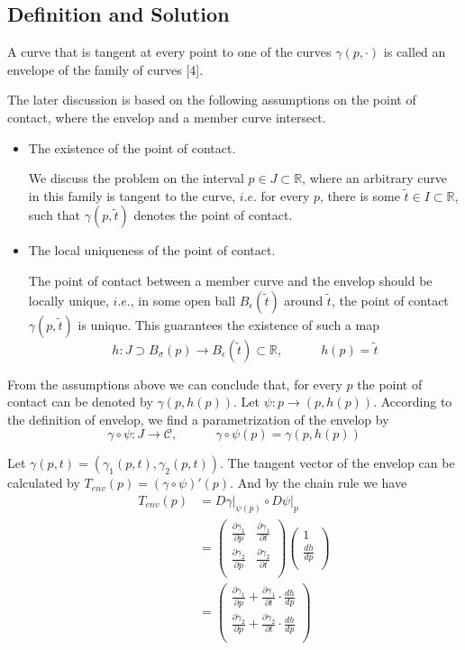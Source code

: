 \documentclass[a4paper]{article}
\begin{document}
\subsection{Definition and Solution}
A curve that is tangent at every point to one of the curves $\gamma(p,\cdot)$ is called an envelope of the family of curves [4]. 

The later discussion is based on the following assumptions on the point of contact, where the envelop and a member curve intersect.
\begin{itemize}
\item The existence of the point of contact.

We discuss the problem on the interval $p \in J \subset \mathbb{R}$, where an arbitrary curve in this family is tangent to the curve, $i.e.$ for every $p$, there is some $\widetilde{t} \in I \subset \mathbb{R}$, such that $\gamma(p,\tilde{t})$ denotes the point of contact.
\item The local uniqueness of the point of contact.

The point of contact between a member curve and the envelop should be locally unique, $i.e.$, in some open ball $B_{\epsilon}(\tilde{t})$ around $\widetilde{t}$, the point of contact $\gamma(p,\tilde{t})$ is unique. This guarantees the existence of such a map 
$$h: J \supset B_{\sigma}(p) \to B_{\epsilon}(\tilde{t}) \subset \mathbb{R},\qquad\quad h(p)=\widetilde{t}$$
\end{itemize}

From the assumptions above we can conclude that, for every $p$ the point of contact can be denoted by $\gamma(p,h(p))$. Let $\psi: p \to (p,h(p))$. According to the definition of envelop, we find a parametrization of the envelop by
$$\gamma \circ \psi: J \to \mathcal{C},\qquad\quad \gamma \circ \psi (p) = \gamma(p,h(p))$$

Let $\gamma(p,t) = (\gamma_1(p,t),\gamma_2(p,t))$. The tangent vector of the envelop can be calculated by $T_{env}(p) = (\gamma \circ \psi)'(p)$. And by the chain rule we have
\begin{align*}
T_{env}(p) &= D\gamma \vert_{\psi(p)} \circ D\psi \vert_{p}\\
&= 
\begin{pmatrix}
\frac{\partial \gamma_1}{\partial p} & \frac{\partial \gamma_1}{\partial t}\\
\frac{\partial \gamma_2}{\partial p} & \frac{\partial \gamma_2}{\partial t}\\
\end{pmatrix}
\begin{pmatrix}
1\\
\frac{dh}{dp}\\
\end{pmatrix}\\
&=
\begin{pmatrix}
\frac{\partial \gamma_1}{\partial p} + \frac{\partial \gamma_1}{\partial t}\cdot \frac{dh}{dp}\\
\frac{\partial \gamma_2}{\partial p} + \frac{\partial \gamma_2}{\partial t}\cdot \frac{dh}{dp}\\
\end{pmatrix}
\end{align*}
\end{document}
